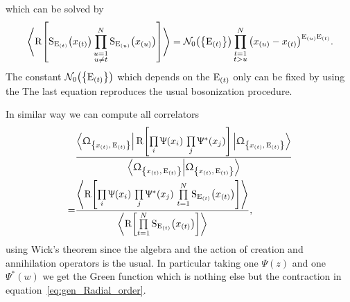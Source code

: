 which can be solved by
\begin{equation}
  \left\langle
    \rR\qty[%
      \rS_{\rE_{(t)}}\qty(x_{(t)})
      \prod\limits_{\substack{u = 1 \\ u \neq t}}^N
      \rS_{\rE_{(u)}}\qty(x_{(u)})
    ]
  \right\rangle
  =
  \cN_0
  \qty( \qty{\rE_{(t)}} )
  \prod\limits_{\substack{t = 1 \\ t > u}}^N
  \qty( x_{(u)} - x_{(t)} )^{\rE_{(u)} \rE_{(t)}}.
\end{equation}
The constant $\cN_0\qty( \qty{\rE_{(t)}} )$ which depends on the $\mathrm{E}_{(t)}$ only can be fixed by using the \ope
The last equation reproduces  the usual bosonization procedure.

In similar way we can compute all correlators
\begin{equation}
  \begin{split}
    &\frac{%
      \GGexcvacbra
      \rR\qty[ \prod\limits_i \Psi(x_i)\, \prod\limits_j \Psi^*(x_j) ]
      \GGexcvacket
    }{\braket{\GGexcvac}}
    \\
    = &
    \frac{%
      \left\langle
        \rR\qty[
          \prod\limits_i \Psi(x_i)\,
          \prod\limits_j \Psi^*(x_j)\,
          \finiteprod{t}{1}{N} \rS_{\rE_{(t)}}\qty(x_{(t)})
        ]
      \right\rangle
    }{
      \left\langle
        \rR\qty[
          \finiteprod{t}{1}{N} \rS_{\rE_{(t)}}\qty(x_{(t)})
        ]
      \right\rangle
    },
  \end{split}
\end{equation}
using Wick's theorem since the algebra and the action of creation and annihilation operators is the usual.
In particular taking one $\Psi(z)$ and one $\Psi^*(w)$ we get the Green function which is nothing else but the contraction in equation~\eqref{eq:gen_Radial_order}.


